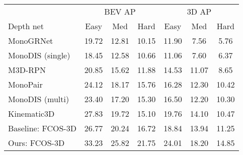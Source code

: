 
\begin{table}[t!]
\centering
{
\footnotesize
\setlength{\tabcolsep}{0.4em}
\begin{tabular}{l|ccc|ccc}
\toprule
& \multicolumn{3}{c}{BEV AP} & \multicolumn{3}{c}{3D AP} \\ 
\multirow{-2}{*}{Depth net}& 
Easy & 
Med &
Hard &
Easy & Med & Hard \vspace{0.5mm}\\
\midrule
MonoGRNet~\cite{qin2019monogrnet} & 
19.72 & 
12.81 &
10.15 &
11.90 &
7.56 &
5.76
\\



MonoDIS (single)~\cite{simonelli2019disentangling} & 
18.45 & 
12.58 &
10.66 &
11.06 &
7.60 &
6.37
\\

M3D-RPN~\cite{brazil2019m3d} & 
20.85 & 
15.62 &
11.88 &
14.53 &
11.07 &
8.65
\\


MonoPair~\cite{chen2020monopair} & 
24.12 & 
18.17 &
15.76 &
16.28 &
12.30 &
10.42
\\

MonoDIS (multi)~\cite{simonelli2020disentangling} & 
23.40 & 
17.20 &
15.30 &
16.50 &
12.20 &
10.30
\\

Kinematic3D~\cite{brazil2020kinematic} & 
27.83 & 
19.72 &
15.10 &
19.76 &
14.10 &
10.47
\\

\midrule

Baseline: FCOS-3D & 
26.77 &
20.24 &
16.72 &
18.84 &
13.94 &
11.25 
\\

Ours: FCOS-3D & 
33.23 &
25.82 &
21.75 &
24.01 &
18.20 &
14.85
\\



\end{tabular}}
\end{table}

